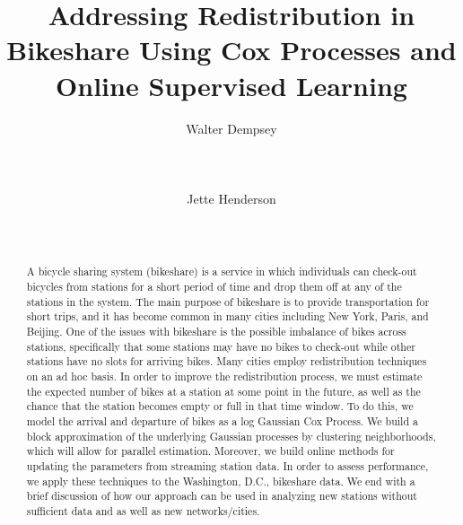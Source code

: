 \documentclass{acm_proc_article-sp}
\begin{document}
\title{Addressing Redistribution in Bikeshare Using Cox Processes and Online Supervised Learning}

\author{
\alignauthor Walter Dempsey\\
       \\
       \\
       \\
\alignauthor Jette Henderson\\
       \\
       \\
}


\maketitle

\begin{abstract}
A bicycle sharing system (bikeshare) is a service in which individuals can check-out bicycles from stations for a short period of time and drop them off at any of the stations in the system. The main purpose of bikeshare is to provide transportation for short trips, and it has become common in many cities including New York, Paris, and Beijing. One of the issues with bikeshare is the possible imbalance of bikes across stations, specifically that some stations may have no bikes to check-out while other stations have no slots for arriving bikes. Many cities employ redistribution techniques on an ad hoc basis. In order to improve the redistribution process, we must estimate the expected number of bikes at a station at some point in the future, as well as the chance that the station becomes empty or full in that time window. To do this, we model the arrival and departure of bikes as a log Gaussian Cox Process. We build a block approximation of the underlying Gaussian processes by clustering  neighborhoods, which will allow for parallel estimation. Moreover, we build online methods for updating the parameters from streaming station data. In order to assess performance, we apply these techniques to the Washington, D.C., bikeshare data. We end with a brief discussion of how our approach can be used in analyzing new stations without sufficient data and as well as new networks/cities. 
\end{abstract}
\end{document}
